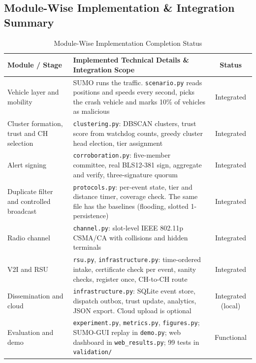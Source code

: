 \documentclass[11pt, a4paper]{article}
\begin{document}
\subsection{Module-Wise Implementation \& Integration Summary}
\begin{table}[H]
    \centering
    \footnotesize
    \renewcommand{\arraystretch}{1.25}
    \begin{tabular}{|p{3.5cm}|p{9.2cm}|c|}
        \hline
        \textbf{Module / Stage} & \textbf{Implemented Technical Details \& Integration Scope} & \textbf{Status} \\
        \hline
        Vehicle layer and mobility & SUMO runs the traffic. \texttt{scenario.py} reads positions and speeds every second, picks the crash vehicle and marks 10\% of vehicles as malicious & Integrated \\
        \hline
        Cluster formation, trust and CH selection & \texttt{clustering.py}: DBSCAN clusters, trust score from watchdog counts, greedy cluster head election, tier assignment & Integrated \\
        \hline
        Alert signing & \texttt{corroboration.py}: five-member committee, real BLS12-381 sign, aggregate and verify, three-signature quorum & Integrated \\
        \hline
        Duplicate filter and controlled broadcast & \texttt{protocols.py}: per-event state, tier and distance timer, coverage check. The same file has the baselines (flooding, slotted 1-persistence) & Integrated \\
        \hline
        Radio channel & \texttt{channel.py}: slot-level IEEE 802.11p CSMA/CA with collisions and hidden terminals \cite{ieee80211p} & Integrated \\
        \hline
        V2I and RSU & \texttt{rsu.py}, \texttt{infrastructure.py}: time-ordered intake, certificate check per event, sanity checks, register once, CH-to-CH route & Integrated \\
        \hline
        Dissemination and cloud & \texttt{infrastructure.py}: SQLite event store, dispatch outbox, trust update, analytics, JSON export. Cloud upload is optional & Integrated (local) \\
        \hline
        Evaluation and demo & \texttt{experiment.py}, \texttt{metrics.py}, \texttt{figures.py}; SUMO-GUI replay in \texttt{demo.py}; web dashboard in \texttt{web\_results.py}; 99 tests in \texttt{validation/} & Functional \\
        \hline
    \end{tabular}
    \caption{Module-Wise Implementation Completion Status}
\end{table}
\end{document}
